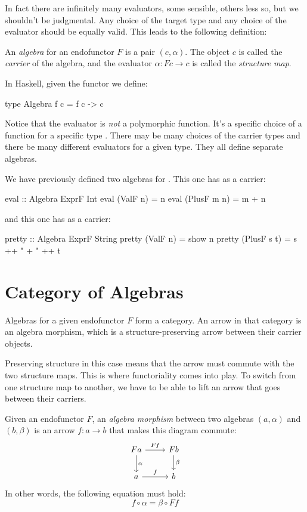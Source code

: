 \documentclass[DaoFP]{subfiles}
\begin{document}
In fact there are infinitely many evaluators, some sensible, others less so, but we shouldn't be judgmental. Any choice of the target type and any choice of the evaluator should be equally valid. This leads to the following definition:

An \emph{algebra} for an endofunctor $F$ is a pair $(c, \alpha)$. The object $c$ is called the \emph{carrier} of the algebra, and the evaluator $\alpha \colon F c \to c$ is called the \emph{structure map}.

In Haskell, given the functor  we define:
\begin{haskell}
type Algebra f c = f c -> c
\end{haskell}

Notice that the evaluator is \emph{not} a polymorphic function. It's a specific choice of a function for a specific type . There may be many choices of the carrier types and there be many different evaluators for a given type. They all define separate algebras.

We have previously defined two algebras for . This one has  as a carrier:
\begin{haskell}
eval :: Algebra ExprF Int
eval (ValF n)   = n
eval (PlusF m n) = m + n
\end{haskell}
and this one has  as a carrier:
\begin{haskell}
pretty :: Algebra ExprF String
pretty (ValF n)   = show n
pretty (PlusF s t) = s ++ " + " ++ t
\end{haskell}

\section{Category of Algebras}

Algebras for a given endofunctor $F$ form a category. An arrow in that category is an algebra morphism, which is a structure-preserving arrow between their carrier objects. 

Preserving structure in this case means that the arrow must commute with the two structure maps. This is where functoriality comes into play. To switch from one structure map to another, we have to be able to lift an arrow that goes between their carriers. 

Given an endofunctor $F$, an \emph{algebra morphism} between two algebras $(a, \alpha)$ and $(b, \beta)$ is an arrow $f \colon a \to b$ that makes this diagram commute:
\[
 \begin{tikzcd}
 F a 
 \arrow[r, "F f"]
 \arrow[d, "\alpha"]
 & F b
\arrow[d, "\beta"]
 \\
 a
 \arrow[r, "f"]
 & b
  \end{tikzcd}
\]
In other words, the following equation must hold:
\[f \circ \alpha = \beta \circ F f \]
\end{document}
